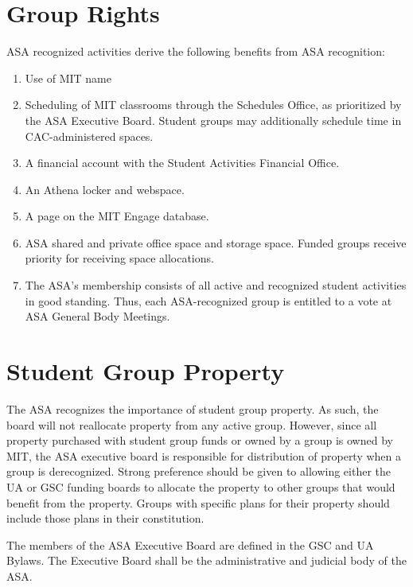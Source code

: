 \documentclass[12pt]{constitution}
\begin{document}
\section{Group Rights}
ASA recognized activities derive the following benefits from ASA recognition:
\begin{enumerate}
    \item Use of MIT name
    
    \item Scheduling of MIT classrooms through the Schedules Office, as prioritized by the ASA
        Executive Board. Student groups may additionally schedule time in CAC-administered spaces.
    
    \item A financial account with the Student Activities Financial Office.
    
    \item An Athena locker and webspace.
    
    \item A page on the MIT Engage database.

    \item ASA shared and private office space and storage space. Funded groups receive priority
        for receiving space allocations.

    \item The ASA's membership consists of all active and recognized student activities in good
        standing.
    Thus, each ASA-recognized group is entitled to a vote at ASA General Body Meetings.
\end{enumerate}

\section{Student Group Property}
The ASA recognizes the importance of student group property.
As such, the board will not reallocate property from any active group.
However, since all property purchased with student group funds or owned by a group is owned by MIT,
    the ASA executive board is responsible for distribution of property when a group is derecognized.
Strong preference should be given to allowing either the UA or GSC funding boards to allocate the
    property to other groups that would benefit from the property.
Groups with specific plans for their property should include those plans in their constitution.


\label{asa_exec}
The members of the ASA Executive Board are defined in the GSC and UA Bylaws.
The Executive Board shall be the administrative and judicial body of the ASA.
\end{document}
